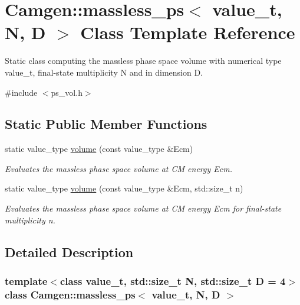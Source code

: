 \hypertarget{a00351}{\section{Camgen\-:\-:massless\-\_\-ps$<$ value\-\_\-t, N, D $>$ Class Template Reference}
\label{a00351}
}


Static class computing the massless phase space volume with numerical type value\-\_\-t, final-\/state multiplicity N and in dimension D.  




{\ttfamily \#include $<$ps\-\_\-vol.\-h$>$}

\subsection*{Static Public Member Functions}
\begin{DoxyCompactItemize}
\item 
\hypertarget{a00351_a749236374a14eb01e197636c92508cb9}{static value\-\_\-type \hyperlink{a00351_a749236374a14eb01e197636c92508cb9}{volume} (const value\-\_\-type \&Ecm)}\label{a00351_a749236374a14eb01e197636c92508cb9}

\begin{DoxyCompactList}\small\item\em Evaluates the massless phase space volume at C\-M energy Ecm. \end{DoxyCompactList}\item 
static value\-\_\-type \hyperlink{a00351_ae001b3575541b2ba0c0496d64f4e6daa}{volume} (const value\-\_\-type \&Ecm, std\-::size\-\_\-t n)
\begin{DoxyCompactList}\small\item\em Evaluates the massless phase space volume at C\-M energy Ecm for final-\/state multiplicity n. \end{DoxyCompactList}\end{DoxyCompactItemize}


\subsection{Detailed Description}
\subsubsection*{template$<$class value\-\_\-t, std\-::size\-\_\-t N, std\-::size\-\_\-t D = 4$>$class Camgen\-::massless\-\_\-ps$<$ value\-\_\-t, N, D $>$}

